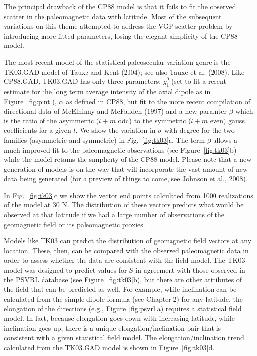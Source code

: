  The principal drawback of the CP88 model is   that it fails to fit the  observed scatter in the paleomagnetic data with latitude. Most of the  subsequent variations on this theme attempted  to address  the VGP scatter problem by introducing more fitted parameters, losing the elegant simplicity of the CP88 model.  

  The most recent model of the statistical paleosecular variation genre is  the TK03.GAD model of  Tauxe and Kent (2004); see also Tauxe et al. (2008). Like CP88.GAD, TK03.GAD has only three parameters:  $\bar g_1^0$ (set to fit a recent estimate for the long term average intensity of the axial dipole as in Figure~\ref{fig:pint}),  $\alpha$ as defined in CP88, but fit to the more recent compilation of directional data of McElhinny and McFadden (1997) and a new paramter $\beta$ which is the ratio of the asymmetric ($l+m$ odd) to the symmetric ($l+m$ even) gauss coefficients for a given $l$.   We show the variation in $\sigma$ with degree for the two families  (asymmetric and symmetric) in Fig.~\ref{fig:tk03}a.    The term $\beta$ allows a much improved fit to the paleomagnetic observations (see Figure~\ref{fig:tk03}b) while the model retains the simplicity of the CP88 model.    Please note that a new generation of models is on the way that will incorporate the vast amount of new data being generated (for a preview of things to come, see Johnson et al., 2008). 
      
 In Fig.~\ref{fig:tk03}c we show the vector end points calculated from 1000 realizations of the model at 30$^{\circ}$N.  The distribution of these vectors predicts what would be observed at that latitude if we had a large number of observations of the geomagnetic field or its paleomagnetic proxies.    
 
 
 Models like TK03 can predict the distribution of geomagnetic field vectors at any location.  These, then, can be compared with the observed paleomagnetic data in order to assess whether the data are consistent with the field model.   The TK03 model was designed to predict values for $S$ in agreement with those observed in the 
PSVRL database (see Figure~\ref{fig:tk03}b), but there are other attributes of the field that can be predicted as well.    For example,  while inclination can be calculated from the simple dipole formula (see Chapter 2) for any latitude, the elongation of the directions (e.g., Figure~\ref{fig:psvrl}a) requires a statistical field model.  In fact, because elongation goes down with increasing latitude, while inclination goes up, there is a unique elongation/inclination pair that is consistent with a given statistical field model.  The elongation/inclination trend calculated from the TK03.GAD model is shown in Figure~\ref{fig:tk03}d.  
 

